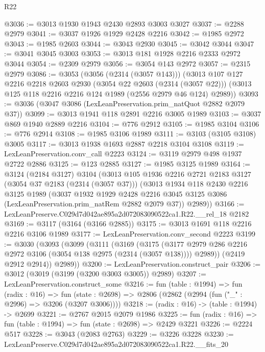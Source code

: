 \begin{lexlean}{R22}
\begin{coremodule}
@3036 := @3013 @1930 @1943 @2430 @2893 @3003 @3027
@3037 := @2288 @2979
@3041 := @3037 @1926 @1929 @2428 @2216
@3042 := @1985 @2972
@3043 := @1985 @2603
@3044 := @3043 @2930
@3045 := @3042 @3044
@3047 := @3041 @3045 @3003
@3053 := @3013 @181 @1928 @2216 @2333 @2972 @3044
@3054 := @2309 @2979
@3056 := @3054 @143 @2972
@3057 := @2315 @2979
@3086 := @3053
    (@3056 (@2314 (@3057 @143)))
    (@3013
      @107
      @127
      @2216
      @2218
      @2603
      @2930
      (@3054 @22 @2603 (@2314 (@3057 @22)))
      (@3013 @125 @118 @2216 @2216 @124 @1989 (@2556 @2979 @46 @124) @2989))
@3093 := @3036 (@3047 @3086 (LexLeanPreservation.prim_natQuot @2882 @2079 @37))
@3099 := @3013 @1941 @118 @2891 @2216 @3005 @1989
@3103 := @3037 @869 @1940 @2889 @2216
@3104 := @776 @2912
@3105 := @1985 @3104
@3106 := @776 @2914
@3108 := @1985 @3106 @1989
@3111 := @3103 (@3105 @3108) @3005
@3117 := @3013 @1938 @1693 @2887 @2218 @3104 @3108
@3119 := LexLeanPreservation.conv_call @2223
@3124 := @3119 @2979 @498 @1937 @2722 @2886
@3125 := @123 @2885
@3127 := @1985 @3125 @1989
@3164 := @3124
    (@2184 @3127)
    @3104
    (@3013
      @105
      @1936
      @2216
      @2721
      @2183
      @3127
      (@3054 @37 @2183 (@2314 (@3057 @37)))
      (@3013
        @1934
        @118
        @2430
        @2216
        @3125
        @1989
        (@3037
          @1932
          @1929
          @2428
          @2216
          @3045
          @3125
          @3086
          (LexLeanPreservation.prim_natRem @2882 @2079 @37))
        @2989))
@3166 := LexLeanPreserve.C029d7d042ae895a2d072083090522ca1.R22.__rel_18 @2182
@3169 := @3117 (@3164 (@3166 @2885))
@3175 := @3013 @1691 @118 @2216 @2216 @3106 @1989
@3177 := LexLeanPreservation.conv_second @2223
@3199 := @3030
    (@3093
      (@3099
        (@3111
          (@3169
            (@3175
              (@3177 @2979 @286 @2216 @2972 @3106 (@3054 @138 @2975 (@2314 (@3057 @138))))
              @2989))
          (@2419 @2912 @2914))
        @2989))
@3200 := LexLeanPreservation.construct_pair
@3206 := @3012 (@3019 (@3199 (@3200 @3003 @3005)) @2989)
@3207 := LexLeanPreservation.construct_some
@3216 := fun (table : @1994) =>
  fun (radix : @16) =>
  fun (state : @2698) => @2806 (@2862 (@2994 (fun ("_" : @2996) => @3206 (@3207 @3006))))
@3218 := (radix : @16) -> (table : @1994) -> @2699
@3221 := @2767 @2015 @2079 @1986
@3225 := fun (radix : @16) => fun (table : @1994) => fun (state : @2698) => @2429 @3221
@3226 := @2224 @517
@3228 := @3043 (@2083 @2763)
@3229 := @3226 @3228
@3230 := LexLeanPreserve.C029d7d042ae895a2d072083090522ca1.R22.__fits_20

\end{coremodule}
\end{lexlean}
